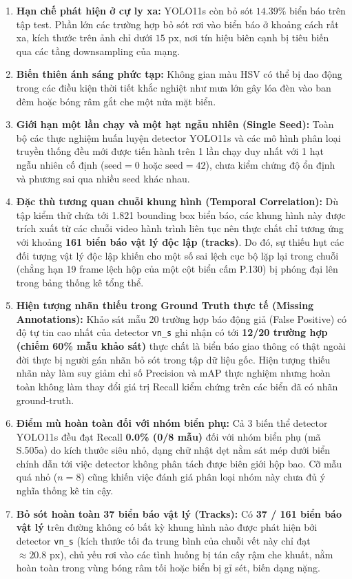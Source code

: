 \documentclass[a4paper, 11pt]{article}
\begin{document}
\begin{enumerate}
    \item \textbf{Hạn chế phát hiện ở cự ly xa:} YOLO11s còn bỏ sót $14.39\%$ biển báo trên tập test. Phần lớn các trường hợp bỏ sót rơi vào biển báo ở khoảng cách rất xa, kích thước trên ảnh chỉ dưới $15\text{ px}$, nơi tín hiệu biên cạnh bị tiêu biến qua các tầng downsampling của mạng.
    \item \textbf{Biến thiên ánh sáng phức tạp:} Không gian màu HSV có thể bị dao động trong các điều kiện thời tiết khắc nghiệt như mưa lớn gây lóa đèn vào ban đêm hoặc bóng râm gắt che một nửa mặt biển.
    \item \textbf{Giới hạn một lần chạy và một hạt ngẫu nhiên (Single Seed):} Toàn bộ các thực nghiệm huấn luyện detector YOLO11s và các mô hình phân loại truyền thống đều mới được tiến hành trên 1 lần chạy duy nhất với 1 hạt ngẫu nhiên cố định ($\text{seed} = 0$ hoặc $\text{seed} = 42$), chưa kiểm chứng độ ổn định và phương sai qua nhiều seed khác nhau.
    \item \textbf{Đặc thù tương quan chuỗi khung hình (Temporal Correlation):} Dù tập kiểm thử chứa tới 1.821 bounding box biển báo, các khung hình này được trích xuất từ các chuỗi video hành trình liên tục nên thực chất chỉ tương ứng với khoảng \textbf{161 biển báo vật lý độc lập (tracks)}. Do đó, sự thiếu hụt các đối tượng vật lý độc lập khiến cho một số sai lệch cục bộ lặp lại trong chuỗi (chẳng hạn 19 frame lệch hộp của một cột biển cấm P.130) bị phóng đại lên trong bảng thống kê tổng thể.
    \item \textbf{Hiện tượng nhãn thiếu trong Ground Truth thực tế (Missing Annotations):} Khảo sát mẫu 20 trường hợp báo động giả (False Positive) có độ tự tin cao nhất của detector \texttt{vn\_s} ghi nhận có tới \textbf{12/20 trường hợp (chiếm 60\% mẫu khảo sát)} thực chất là biển báo giao thông có thật ngoài đời thực bị người gán nhãn bỏ sót trong tập dữ liệu gốc. Hiện tượng thiếu nhãn này làm suy giảm chỉ số Precision và mAP thực nghiệm nhưng hoàn toàn không làm thay đổi giá trị Recall kiểm chứng trên các biển đã có nhãn ground-truth.
    \item \textbf{Điểm mù hoàn toàn đối với nhóm biển phụ:} Cả 3 biến thể detector YOLO11s đều đạt Recall \textbf{0.0\% (0/8 mẫu)} đối với nhóm biển phụ (mã S.505a) do kích thước siêu nhỏ, dạng chữ nhật dẹt nằm sát mép dưới biển chính dẫn tới việc detector không phân tách được biên giới hộp bao. Cỡ mẫu quá nhỏ ($n=8$) cũng khiến việc đánh giá phân loại nhóm này chưa đủ ý nghĩa thống kê tin cậy.
    \item \textbf{Bỏ sót hoàn toàn 37 biển báo vật lý (Tracks):} Có \textbf{37 / 161 biển báo vật lý} trên đường không có bất kỳ khung hình nào được phát hiện bởi detector \texttt{vn\_s} (kích thước tối đa trung bình của chuỗi vết này chỉ đạt $\approx 20.8\text{ px}$), chủ yếu rơi vào các tình huống bị tán cây rậm che khuất, nằm hoàn toàn trong vùng bóng râm tối hoặc biển bị gỉ sét, biến dạng nặng.

\end{enumerate}
\end{document}

